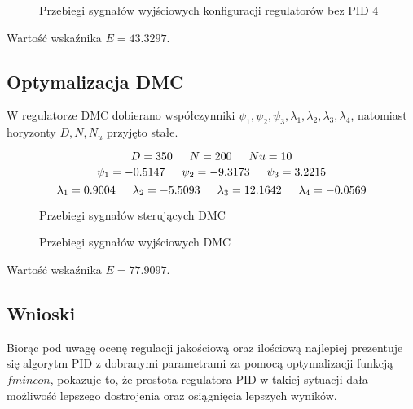 \ifdefined\CompileFigures
\begin{figure}[H] 
    \centering
    
    \caption{Przebiegi sygnałów wyjściowych konfiguracji regulatorów bez PID 4}
    \label{projekt:zad5:figure:projzadanie5PIDbezu4y}
\end{figure}
\fi

Wartość wskaźnika $E=\num{43.3297}$.

\newpage
\subsection{Optymalizacja DMC}

W regulatorze DMC dobierano współczynniki $\psi_1, \psi_2, \psi_3, \lambda_1, \lambda_2, 
\lambda_3, \lambda_4$, 
natomiast horyzonty $D, N, N_u$ przyjęto stałe.


$$D=350 \indent  N=200 \indent  Nu=10$$ 
$$\psi_1=\num{-0.5147} \indent \psi_2=\num{-9.3173} \indent \psi_3=\num{3.2215 }$$
$$\lambda_1=\num{0.9004} \indent \lambda_2=\num{-5.5093} \indent \lambda_3=\num{12.1642} \indent \lambda_4=\num{-0.0569}$$



\ifdefined\CompileFigures
\begin{figure}[H] 
    \centering
    
    \caption{Przebiegi sygnałów sterujących DMC}
    \label{projekt:zad5:figure:projzadanie5DMCu}
\end{figure}
\fi

\ifdefined\CompileFigures
\begin{figure}[H] 
    \centering
    
    \caption{Przebiegi sygnałów wyjściowych DMC}
    \label{projekt:zad5:figure:projzadanie5DMCy}
\end{figure}
\fi

Wartość wskaźnika $E=\num{77.9097}$.

\newpage
\subsection{Wnioski}

Biorąc pod uwagę ocenę regulacji jakościową oraz ilościową najlepiej prezentuje się
algorytm PID z dobranymi parametrami za pomocą optymalizacji funkcją $fmincon$,
pokazuje to, że prostota regulatora PID w takiej sytuacji dała możliwość lepszego
dostrojenia oraz osiągnięcia lepszych wyników.

